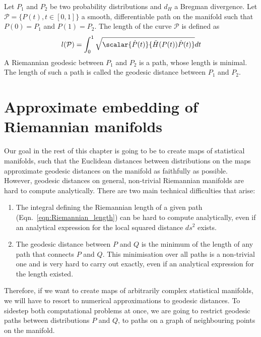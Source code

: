 \begin{definition}
	Let $P_1$ and $P_2$ be two probability distributions and $d_H$ a Bregman divergence. Let $\mathcal{P}=\{P(t),t\in[0,1]\}$ a smooth, differentiable path on the manifold such that $P(0)=P_1$ and $P(1)=P_2$. The length of the curve $\mathcal{P}$ is defined as
	\begin{equation}
		l(\mathcal{P}) = \int_{0}^{1} \sqrt{ \scalar{\dot{P}(t)}{\ddot{H}(P(t))\dot{P}(t)}} dt \label{eqn:Riemannian_length}
	\end{equation}
	A Riemannian geodesic between $P_1$ and $P_2$ is a path, whose length is minimal. The length of such a path is called the geodesic distance between $P_1$ and $P_2$.
\end{definition}


\section{Approximate embedding of Riemannian manifolds}

Our goal in the rest of this chapter is going to be to create maps of statistical manifolds, such that the Euclidean distances between distributions on the maps approximate geodesic distances on the manifold as faithfully as possible. However, geodesic distances on general, non-trivial Riemannian manifolds are hard to compute analytically. There are two main technical difficulties that arise:

\begin{enumerate}
	\item The integral defining the Riemannian length of a given path (Eqn.\ \eqref{eqn:Riemannian_length}) can be hard to compute analytically, even if an analytical expression for the local squared distance $ds^2$ exists.
	\item The geodesic distance between $P$ and $Q$ is the minimum of the length of any path that connects $P$ and $Q$. This minimisation over all paths is a non-trivial one and is very hard to carry out exactly, even if an analytical expression for the length existed.
\end{enumerate}

Therefore, if we want to create maps of arbitrarily complex statistical manifolds, we will have to resort to numerical approximations to geodesic distances. To sidestep both computational problems at once, we are going to restrict geodesic paths between distributions $P$ and $Q$, to paths on a graph of neighbouring points on the manifold.


